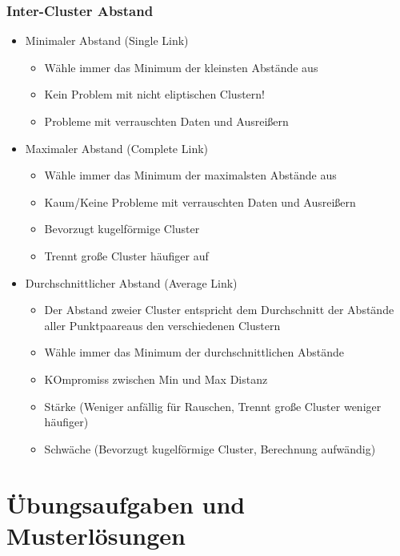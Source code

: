 \documentclass[a4paper]{article}
\begin{document}
\begin{landscape}
\begin{multicols}{3}
    \subsubsection{Inter-Cluster Abstand}
    \begin{itemize}[noitemsep,nolistsep]
        \item Minimaler Abstand (Single Link)
        \begin{itemize}[noitemsep,nolistsep]
            \item Wähle immer das Minimum der kleinsten Abstände aus
            \item Kein Problem mit nicht eliptischen Clustern!
            \item Probleme mit verrauschten Daten und Ausreißern
        \end{itemize}
        \item Maximaler Abstand (Complete Link)
        \begin{itemize}[noitemsep,nolistsep]
            \item Wähle immer das Minimum der maximalsten Abstände aus
            \item Kaum/Keine Probleme mit verrauschten Daten und Ausreißern
            \item Bevorzugt kugelförmige Cluster
            \item Trennt große Cluster häufiger auf
        \end{itemize}
        \item Durchschnittlicher Abstand (Average Link)
        \begin{itemize}[noitemsep,nolistsep]
            \item Der Abstand zweier Cluster entspricht dem Durchschnitt der Abstände aller Punktpaareaus den verschiedenen Clustern
            \item Wähle immer das Minimum der durchschnittlichen Abstände
            \item KOmpromiss zwischen Min und Max Distanz
            \item Stärke (Weniger anfällig für Rauschen, Trennt große Cluster weniger häufiger)
            \item Schwäche (Bevorzugt kugelförmige Cluster, Berechnung aufwändig)
        \end{itemize}
    \end{itemize}


    



    \end{multicols}
    \newpage
    \section{Übungsaufgaben und Musterlösungen}
\end{landscape}
\end{document}

